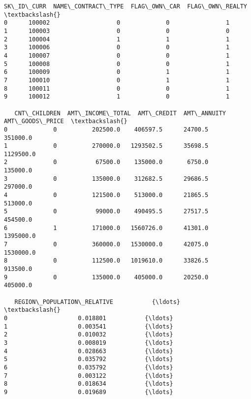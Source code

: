 \documentclass[11pt]{article}
\begin{document}
    \begin{Verbatim}[commandchars=\\\{\}]
   SK\_ID\_CURR  NAME\_CONTRACT\_TYPE  FLAG\_OWN\_CAR  FLAG\_OWN\_REALTY  \textbackslash{}
0      100002                   0             0                1   
1      100003                   0             0                0   
2      100004                   1             1                1   
3      100006                   0             0                1   
4      100007                   0             0                1   
5      100008                   0             0                1   
6      100009                   0             1                1   
7      100010                   0             1                1   
8      100011                   0             0                1   
9      100012                   1             0                1   

   CNT\_CHILDREN  AMT\_INCOME\_TOTAL  AMT\_CREDIT  AMT\_ANNUITY  AMT\_GOODS\_PRICE  \textbackslash{}
0             0          202500.0    406597.5      24700.5         351000.0   
1             0          270000.0   1293502.5      35698.5        1129500.0   
2             0           67500.0    135000.0       6750.0         135000.0   
3             0          135000.0    312682.5      29686.5         297000.0   
4             0          121500.0    513000.0      21865.5         513000.0   
5             0           99000.0    490495.5      27517.5         454500.0   
6             1          171000.0   1560726.0      41301.0        1395000.0   
7             0          360000.0   1530000.0      42075.0        1530000.0   
8             0          112500.0   1019610.0      33826.5         913500.0   
9             0          135000.0    405000.0      20250.0         405000.0   

   REGION\_POPULATION\_RELATIVE           {\ldots}             \textbackslash{}
0                    0.018801           {\ldots}              
1                    0.003541           {\ldots}              
2                    0.010032           {\ldots}              
3                    0.008019           {\ldots}              
4                    0.028663           {\ldots}              
5                    0.035792           {\ldots}              
6                    0.035792           {\ldots}              
7                    0.003122           {\ldots}              
8                    0.018634           {\ldots}              
9                    0.019689           {\ldots}              


\end{Verbatim}
\end{document}
